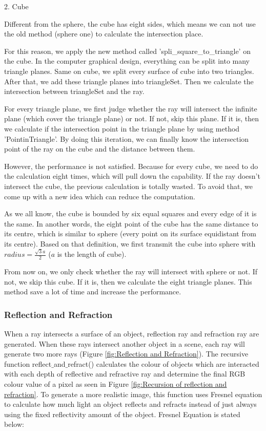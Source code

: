 \documentclass[a4paper, 12pt]{article}
\begin{document}
2. Cube

Different from the sphere, the cube has eight sides, which means we can not use the old method (sphere one) to calculate the intersection place.

For this reason, we apply the new method called 'spli\_square\_to\_triangle' on the cube. In the computer graphical design, everything can be split into many triangle planes. Same on cube, we split every surface of cube into two triangles. After that, we add these triangle planes into triangleSet. Then we calculate the intersection between triangleSet and the ray.

For every triangle plane, we first judge whether the ray will intersect the infinite plane (which cover the triangle plane) or not. If not, skip this plane. If it is, then we calculate if the intersection point in the triangle plane by using method 'PointinTriangle'. By doing this iteration, we can finally know the intersection point of the ray on the cube and the distance between them.

However, the performance is not satisfied. Because for every cube, we need to do the calculation eight times, which will pull down the capability. If the ray doesn't intersect the cube, the previous calculation is totally wasted. To avoid that, we come up with a new idea which can reduce the computation.

As we all know, the cube is bounded by six equal squares and every edge of it is the same. In another words, the eight point of the cube has the same distance to its centre, which is similar to sphere (every point on its surface equidistant from its centre). Based on that definition, we first transmit the cube into sphere with $radius = \frac {\sqrt 3a}{2}$ ($a$ is the length of cube).

From now on, we only check whether the ray will intersect with sphere or not. If not, we skip this cube. If it is, then we calculate the eight triangle planes. This method save a lot of time and increase the performance.

\subsubsection{Reflection and Refraction}
When a ray intersects a surface of an object, reflection ray and refraction ray are generated. When these rays intersect another object in a scene, each ray will generate two more rays (Figure \ref{fig:Reflection and Refraction}). The recursive function reflect$\_$and$\_$refract() calculates the colour of objects which are interacted with each depth of reflective and refractive ray and determine the final RGB colour value of a pixel as seen in Figure \ref{fig:Recursion of reflection and refraction}. To generate a more realistic image, this function uses Fresnel equation \cite{Learn Computer Graphics From Scratch} to calculate how much light an object reflects and refracts instead of just always using the fixed reflectivity amount of the object. Fresnel Equation is stated below:
\end{document}
